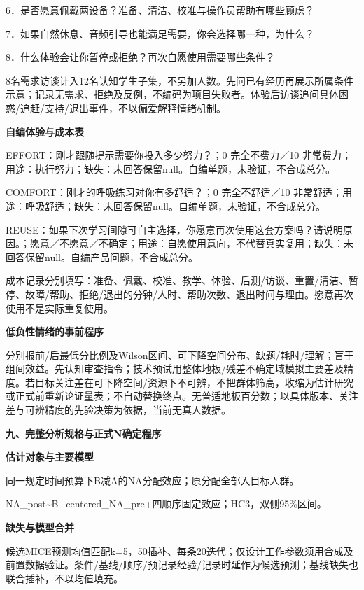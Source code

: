 \documentclass[11pt,a4paper]{article}
\newcommand{\reviewsection}[1]{\par\Needspace{6\baselineskip}\begin{center}{\titlelatin\titlecjk\bfseries\fontsize{14}{20}\selectfont #1}\end{center}}
\newcommand{\reviewsubsection}[1]{\par\Needspace{4\baselineskip}\begin{center}{\titlelatin\titlecjk\bfseries\fontsize{12}{18}\selectfont #1}\end{center}}
\begin{document}
6．是否愿意佩戴两设备？准备、清洁、校准与操作员帮助有哪些顾虑？

7．如果自然休息、音频引导也能满足需要，你会选择哪一种，为什么？

8．什么体验会让你暂停或拒绝？再次自愿使用需要哪些条件？

8名需求访谈计入12名认知学生子集，不另加人数。先问已有经历再展示所属条件示意；记录无需求、拒绝及反例，不编码为项目失败者。体验后访谈追问具体困惑/\allowbreak{}追赶/\allowbreak{}支持/\allowbreak{}退出事件，不以偏爱解释情绪机制。

\reviewsubsection{8.2 自编体验与成本表}
EFFORT：刚才跟随提示需要你投入多少努力？；0 完全不费力／10 非常费力；用途：执行努力；缺失：未回答保留null。自编单题，未验证，不合成总分。

COMFORT：刚才的呼吸练习对你有多舒适？；0 完全不舒适／10 非常舒适；用途：呼吸舒适；缺失：未回答保留null。自编单题，未验证，不合成总分。

REUSE：如果下次学习间隙可自主选择，你愿意再次使用这套方案吗？请说明原因。；愿意／不愿意／不确定；用途：自愿使用意向，不代替真实复用；缺失：未回答保留null。自编产品问题，不合成总分。

成本记录分别填写：准备、佩戴、校准、教学、体验、后测/\allowbreak{}访谈、重置/\allowbreak{}清洁、暂停、故障/\allowbreak{}帮助、拒绝/\allowbreak{}退出的分钟/\allowbreak{}人时、帮助次数、退出时间与理由。愿意再次使用不是实际重复使用。

\reviewsubsection{8.3 低负性情绪的事前程序}
分别报前/\allowbreak{}后最低分比例及Wilson区间、可下降空间分布、缺题/\allowbreak{}耗时/\allowbreak{}理解；盲于组间效益。先认知审查指令；技术预试用整体地板/\allowbreak{}残差不确定域模拟主要差及精度。若目标关注差在可下降空间/\allowbreak{}资源下不可辨，不把群体筛高，收缩为估计研究或正式前重新论证量表；不自动替换终点。无普适地板百分数；以具体版本、关注差与可辨精度的先验决策为依据，当前无真人数据。

\newpage\reviewsection{九、完整分析规格与正式N确定程序}
\reviewsubsection{9.1 估计对象与主要模型}
同一规定时间预算下B减A的NA分配效应；原分配全部入目标人群。

NA\_\allowbreak{}post\textasciitilde{}B+centered\_\allowbreak{}NA\_\allowbreak{}pre+四顺序固定效应；HC3，双侧95\%区间。

\reviewsubsection{9.2 缺失与模型合并}
候选MICE预测均值匹配k=5，50插补、每条20迭代；仅设计工作参数须用合成及前置数据验证。条件/\allowbreak{}基线/\allowbreak{}顺序/\allowbreak{}预记录经验/\allowbreak{}记录时延作为候选预测；基线缺失也联合插补，不以均值填充。
\end{document}
